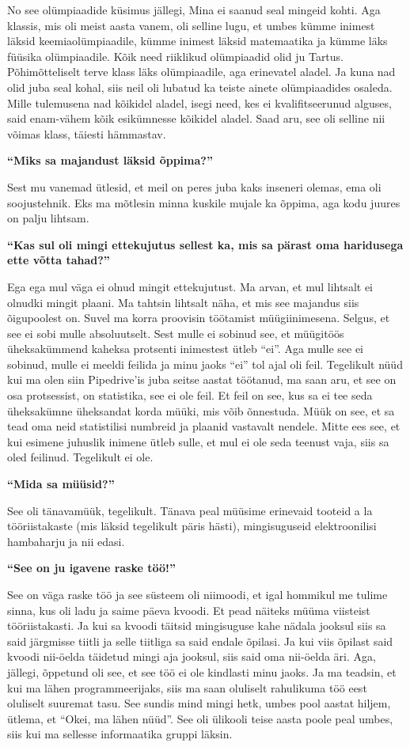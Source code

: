 No see olümpiaadide küsimus jällegi, Mina ei saanud seal mingeid kohti. Aga 
klassis, mis oli meist aasta vanem,
 oli selline lugu, et umbes kümme inimest läksid keemiaolümpiaadile, kümme 
inimest läksid matemaatika ja kümme läks füüsika olümpiaadile. Kõik need 
riiklikud olümpiaadid olid ju Tartus. Põhimõtteliselt terve klass läks 
olümpiaadile, aga erinevatel aladel. Ja kuna nad olid juba seal kohal, siis 
neil oli lubatud  ka teiste ainete olümpiaadides osaleda. Mille tulemusena nad 
kõikidel aladel, isegi need, kes ei kvalifitseerunud alguses, said enam-vähem 
kõik esikümnesse kõikidel aladel. Saad aru, see oli selline nii võimas klass, 
täiesti hämmastav.

\textbf{\enquote{Miks sa majandust läksid õppima?}}

Sest mu vanemad ütlesid, et meil on peres juba kaks inseneri olemas, ema oli 
soojustehnik. Eks ma mõtlesin minna kuskile mujale ka õppima, aga  kodu juures 
on palju lihtsam. 

\textbf{\enquote{Kas sul oli mingi ettekujutus sellest ka, mis sa pärast oma 
haridusega ette võtta tahad?}}

Ega ega mul väga ei olnud mingit ettekujutust. Ma arvan, et mul lihtsalt ei 
olnudki mingit plaani. Ma tahtsin lihtsalt näha, et mis  see majandus siis 
õigupoolest on. Suvel ma korra proovisin töötamist müügiinimesena. Selgus, et 
see ei sobi mulle absoluutselt. Sest mulle ei sobinud see, et müügitöös 
üheksakümmend kaheksa protsenti inimestest ütleb \enquote{ei}. Aga mulle see ei 
sobinud, mulle ei meeldi feilida ja minu jaoks \enquote{ei} tol ajal oli feil. 
Tegelikult nüüd kui ma olen siin Pipedrive'is juba seitse 
aastat töötanud, ma saan aru, et see on osa protsessist, on statistika, see ei 
ole feil. Et feil on see, kus sa ei tee seda üheksakümne üheksandat korda
müüki, mis võib õnnestuda. Müük on see, et sa tead oma neid statistilisi 
numbreid ja plaanid vastavalt nendele. Mitte ees see, et kui esimene juhuslik 
inimene ütleb sulle, et mul ei ole seda teenust vaja, siis sa oled feilinud. 
Tegelikult ei ole.

\textbf{\enquote{Mida sa müüsid?}}

See oli tänavamüük, tegelikult. Tänava peal müüsime erinevaid tooteid a la 
tööriistakaste (mis läksid tegelikult päris hästi), mingisuguseid 
elektroonilisi hambaharju ja nii edasi.

\textbf{\enquote{See on ju igavene raske töö!}}

See on väga raske töö ja  see süsteem oli niimoodi, et igal hommikul me tulime 
sinna, kus oli ladu ja saime päeva kvoodi. Et pead näiteks müüma viisteist 
tööriistakasti. Ja kui sa kvoodi täitsid mingisuguse kahe nädala jooksul siis 
sa said järgmisse tiitli ja selle tiitliga sa said endale õpilasi. Ja kui viis 
õpilast said kvoodi nii-öelda täidetud mingi aja jooksul, siis said oma 
nii-öelda äri. Aga, jällegi, õppetund oli see, et see töö ei ole kindlasti minu 
jaoks. Ja ma teadsin, et kui ma lähen programmeerijaks, siis ma saan oluliselt 
rahulikuma töö eest oluliselt suuremat tasu. See sundis mind mingi hetk, umbes 
pool aastat hiljem, ütlema, et \enquote{Okei, ma lähen nüüd}. See oli ülikooli 
teise aasta poole peal umbes, siis kui ma sellesse informaatika gruppi läksin.

